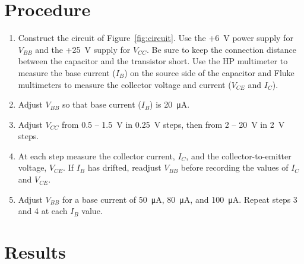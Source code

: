 
\section{Procedure}

\begin{enumerate}
The following steps were observed to plot the output characteristic of a common emmitter transistor circuit:
\item Construct the circuit of Figure~\ref{fig:circuit}.  Use the +\SI{6}{V} power supply for $V_{BB}$ and the +\SI{25}{V} supply for $V_{CC}$.  Be sure to keep the connection distance between the capacitor and the transistor short.  Use the HP multimeter to measure the base current ($I_B$) on the source side of the capacitor and Fluke multimeters to measure the collector voltage and current ($V_{CE}$ and $I_C$).
\item Adjust $V_{BB}$ so that base current ($I_B$) is \SI{20}{\micro\ampere}.
\item Adjust $V_{CC}$ from 0.5 -- \SI{1.5}{V} in \SI{0.25}{V} steps, then from 2 -- \SI{20}{V} in \SI{2}{V} steps.
\item At each step measure the collector current, $I_C$, and the collector-to-emitter voltage, $V_{CE}$.  If $I_B$ has drifted, readjust $V_{BB}$ before recording the values of $I_C$ and $V_{CE}$.
\item Adjust $V_{BB}$ for a base current of \SI{50}{\micro\ampere}, \SI{80}{\micro\ampere}, and \SI{100}{\micro\ampere}.  Repeat steps 3 and 4 at each $I_B$ value.
\end{enumerate}

\section{Results}

